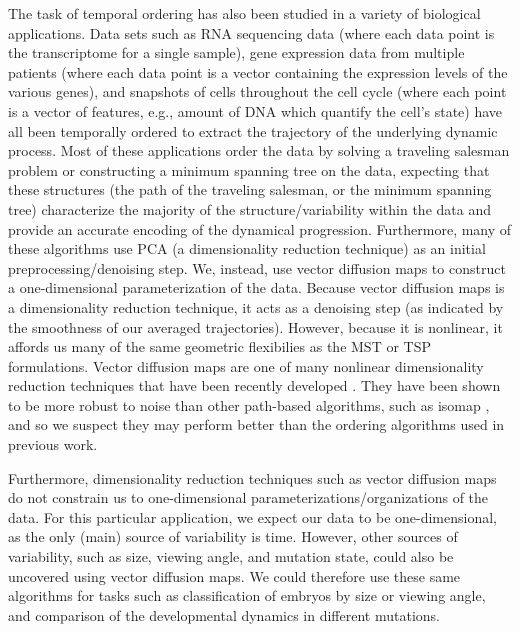 \documentclass{pnastwo}
\begin{document}
\begin{article}
The task of temporal ordering has also been studied in a variety of biological applications. 
%
Data sets such as  RNA sequencing data \cite{anavy2014blind, trapnell2014dynamics} (where each data point is the transcriptome for a single sample), gene expression data from multiple patients \cite{gupta2008extracting, qiu2011discovering} (where each data point is a vector containing the expression levels of the various genes), and snapshots of cells throughout the cell cycle (where each point is a vector of features, e.g., amount of DNA which quantify the cell's state)  \cite{kafri2013dynamics} have all been temporally ordered to extract the trajectory of the underlying dynamic process.
%
Most of these applications order the data by solving a traveling salesman problem or constructing a minimum spanning tree on the data,
expecting that these structures (the path of the traveling salesman, or the minimum spanning tree) characterize the majority of the structure/variability within the data and provide an accurate encoding of the dynamical progression.
%
Furthermore, many of these algorithms use PCA (a dimensionality reduction technique) as an initial preprocessing/denoising step. 
%
We, instead, use vector diffusion maps to construct a one-dimensional parameterization of the data.
%
Because vector diffusion maps is a dimensionality reduction technique, it acts as a denoising step (as indicated by the smoothness of our averaged trajectories).
%
However, because it is nonlinear, it affords us many of the same geometric flexibilies as the MST or TSP formulations. 
%
Vector diffusion maps are one of many nonlinear dimensionality reduction techniques that have been recently developed \cite{Belkin2003, tenenbaum2000global, Donoho2003, Roweis2000}.
%
They have been shown to be more robust to noise than other path-based algorithms, such as isomap \cite{balasubramanian2002isomap}, and so we suspect they may perform better than the ordering algorithms used in previous work.

Furthermore, dimensionality reduction techniques such as vector diffusion maps do not constrain us to one-dimensional parameterizations/organizations of the data.
%
For this particular application, we expect our data to be one-dimensional, as the only (main) source of variability is time.
%
However, other sources of variability, such as size, viewing angle, and mutation state, could also be uncovered using vector diffusion maps.
%
We could therefore use these same algorithms for tasks such as classification of embryos by size or viewing angle, and comparison of the developmental dynamics in different mutations.


\end{article}
\end{document}
